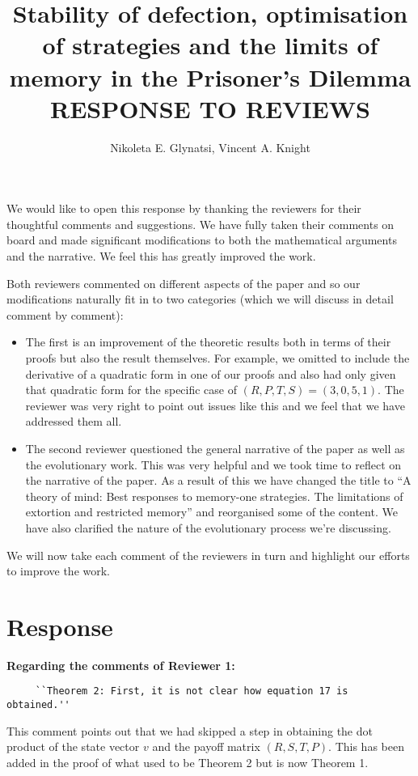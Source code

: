 \documentclass{article}
\title{Stability of defection, optimisation of strategies and the limits of
memory in the Prisoner's Dilemma RESPONSE TO REVIEWS}
\author{Nikoleta E. Glynatsi, Vincent A. Knight}
\begin{document}
\maketitle

We would like to open this response by thanking the reviewers for their
thoughtful comments and suggestions. We have fully taken their comments on board
and made significant modifications to both the mathematical arguments and the narrative. We feel this has greatly improved the work.

Both reviewers commented on different aspects of the paper and so our modifications
naturally fit in to two categories (which we will discuss in detail comment by comment):

\begin{itemize}
    \item The first is an improvement of the theoretic results both in terms of
    their proofs but also the result themselves. For example, we omitted to
    include the derivative of a quadratic form in one of our proofs
    and also had only given that quadratic form for the specific case of \((R,
    P, T, S)=(3, 0, 5, 1)\). The reviewer was very right to point out issues
    like this and we feel that we have addressed them all.
    \item The second reviewer questioned the general narrative of the paper as
    well as the evolutionary work. This was very helpful and we took time to
    reflect on the narrative of the paper. As a result of this we have changed
    the title to ``A theory of mind: Best responses to memory-one strategies.
    The limitations of extortion and restricted memory'' and reorganised some of
    the content. We have also clarified the nature of the evolutionary process
    we're discussing.
\end{itemize}

We will now take each comment of the reviewers in turn and highlight our efforts
to improve the work.

\section{Response}

\textbf{Regarding the comments of Reviewer 1:}

\begin{verbatim}
     ``Theorem 2: First, it is not clear how equation 17 is obtained.''
\end{verbatim}

This comment points out that we had skipped a step in obtaining the dot product
of the state vector \(v\) and the payoff matrix \((R, S, T, P)\).
This has been added in the proof of what used to be Theorem 2 but is now Theorem 1.
\end{document}
